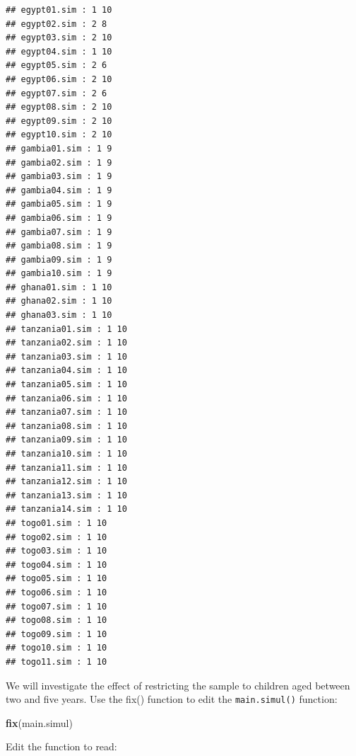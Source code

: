 \documentclass[12pt,a4paper]{book}
\newenvironment{Shaded}{\begin{snugshade}}{\end{snugshade}}
\newcommand{\CharTok}[1]{\textcolor[rgb]{0.31,0.60,0.02}{#1}}
\newcommand{\ControlFlowTok}[1]{\textcolor[rgb]{0.13,0.29,0.53}{\textbf{#1}}}
\newcommand{\DataTypeTok}[1]{\textcolor[rgb]{0.13,0.29,0.53}{#1}}
\newcommand{\DecValTok}[1]{\textcolor[rgb]{0.00,0.00,0.81}{#1}}
\newcommand{\KeywordTok}[1]{\textcolor[rgb]{0.13,0.29,0.53}{\textbf{#1}}}
\newcommand{\NormalTok}[1]{#1}
\newcommand{\OperatorTok}[1]{\textcolor[rgb]{0.81,0.36,0.00}{\textbf{#1}}}
\newcommand{\OtherTok}[1]{\textcolor[rgb]{0.56,0.35,0.01}{#1}}
\newcommand{\StringTok}[1]{\textcolor[rgb]{0.31,0.60,0.02}{#1}}
\theoremstyle{definition}
\theoremstyle{definition}
\theoremstyle{definition}
\theoremstyle{remark}
\begin{document}
\begin{verbatim}
## egypt01.sim : 1 10 
## egypt02.sim : 2 8 
## egypt03.sim : 2 10 
## egypt04.sim : 1 10 
## egypt05.sim : 2 6 
## egypt06.sim : 2 10 
## egypt07.sim : 2 6 
## egypt08.sim : 2 10 
## egypt09.sim : 2 10 
## egypt10.sim : 2 10 
## gambia01.sim : 1 9 
## gambia02.sim : 1 9 
## gambia03.sim : 1 9 
## gambia04.sim : 1 9 
## gambia05.sim : 1 9 
## gambia06.sim : 1 9 
## gambia07.sim : 1 9 
## gambia08.sim : 1 9 
## gambia09.sim : 1 9 
## gambia10.sim : 1 9 
## ghana01.sim : 1 10 
## ghana02.sim : 1 10 
## ghana03.sim : 1 10 
## tanzania01.sim : 1 10 
## tanzania02.sim : 1 10 
## tanzania03.sim : 1 10 
## tanzania04.sim : 1 10 
## tanzania05.sim : 1 10 
## tanzania06.sim : 1 10 
## tanzania07.sim : 1 10 
## tanzania08.sim : 1 10 
## tanzania09.sim : 1 10 
## tanzania10.sim : 1 10 
## tanzania11.sim : 1 10 
## tanzania12.sim : 1 10 
## tanzania13.sim : 1 10 
## tanzania14.sim : 1 10 
## togo01.sim : 1 10 
## togo02.sim : 1 10 
## togo03.sim : 1 10 
## togo04.sim : 1 10 
## togo05.sim : 1 10 
## togo06.sim : 1 10 
## togo07.sim : 1 10 
## togo08.sim : 1 10 
## togo09.sim : 1 10 
## togo10.sim : 1 10 
## togo11.sim : 1 10
\end{verbatim}

We will investigate the effect of restricting the sample to children
aged between two and five years. Use the fix() function to edit the
\texttt{main.simul()} function:

\begin{Shaded}
\begin{Highlighting}[]
\KeywordTok{fix}\NormalTok{(main.simul)}
\end{Highlighting}
\end{Shaded}

Edit the function to read:

\begin{Shaded}
\end{Shaded}
\end{document}

